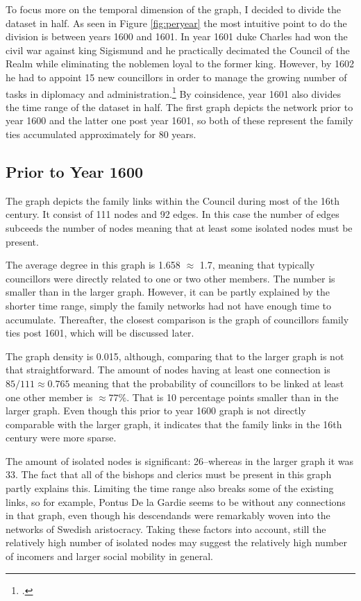 To focus more on the temporal dimension of the graph, I decided to divide the dataset in half. As seen in Figure \ref{fig:peryear} the most intuitive point to do the division is between years 1600 and 1601. In year 1601 duke Charles had won the civil war against king Sigismund and he practically decimated the Council of the Realm while eliminating the noblemen loyal to the former king. However, by 1602 he had to appoint 15 new councillors in order to manage the growing number of tasks in diplomacy and administration.\footcite[TODO]{pSuurvalta} By coinsidence, year 1601 also divides the time range of the dataset in half. The first graph depicts the network prior to year 1600 and the latter one post year 1601, so both of these represent the family ties accumulated approximately for 80 years.

\subsection{Prior to Year 1600}
The graph depicts the family links within the Council during most of the 16th century. It consist of 111 nodes and 92 edges. In this case the number of edges subceeds the number of nodes meaning that at least some isolated nodes must be present. 

The average degree in this graph is 1.658 $\approx$ 1.7, meaning that typically councillors were directly related to one or two other members. The number is smaller than in the larger graph. However, it can be partly explained by the shorter time range, simply the family networks had not have enough time to accumulate. Thereafter, the closest comparison is the graph of councillors family ties post 1601, which will be discussed later.

The graph density is 0.015, although, comparing that to the larger graph is not that straightforward. The amount of nodes having at least one connection is $85/111 \approx 0.765$ meaning that the probability of councillors to be linked at least one other member is $\approx 77\%$. That is 10 percentage points smaller than in the larger graph. Even though this prior to year 1600 graph is not directly comparable with the larger graph, it indicates that the family links in the 16th century were more sparse.

The amount of isolated nodes is significant: 26–whereas in the larger graph it was 33. The fact that all of the bishops and clerics must be present in this graph partly explains this. Limiting the time range also breaks some of the existing links, so for example, Pontus De la Gardie seems to be without any connections in that graph, even though his descendands were remarkably woven into the networks of Swedish aristocracy. Taking these factors into account, still the relatively high number of isolated nodes may suggest the relatively high number of incomers and larger social mobility in general.

